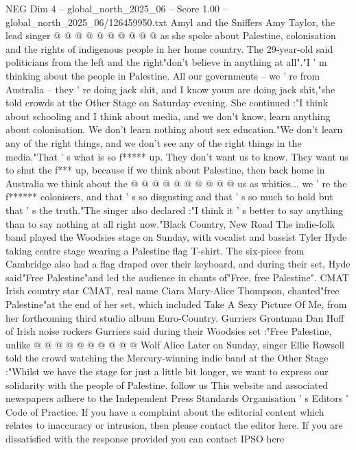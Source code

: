 \begin{textsample}{NEG Dim 4 – global\_north\_2025\_06 – Score 1.00 – global\_north\_2025\_06/126459950.txt}
Amyl and the Sniffers Amy Taylor, the lead singer @ @ @ @ @ @ @ @ @ @ as she spoke about Palestine, colonisation and the rights of indigenous people in her home country.
The 29-year-old said politicians from the left and the right"don't believe in anything at all"."I ' m thinking about the people in Palestine.
All our governments -- we ' re from Australia -- they ' re doing jack shit, and I know yours are doing jack shit,"she told crowds at the Other Stage on Saturday evening.
She continued :"I think about schooling and I think about media, and we don't know, learn anything about colonisation.
We don't learn nothing about sex education."We don't learn any of the right things, and we don't see any of the right things in the media."That ' s what is so f***** up.
They don't want us to know.
They want us to shut the f*** up, because if we think about Palestine, then back home in Australia we think about the @ @ @ @ @ @ @ @ @ @ us as whities... we ' re the f****** colonisers, and that ' s so disgusting and that ' s so much to hold but that ' s the truth."The singer also declared :"I think it ' s better to say anything than to say nothing at all right now."Black Country, New Road The indie-folk band played the Woodsies stage on Sunday, with vocalist and bassist Tyler Hyde taking centre stage wearing a Palestine flag T-shirt.
The six-piece from Cambridge also had a flag draped over their keyboard, and during their set, Hyde said"Free Palestine"and led the audience in chants of"Free, free Palestine".
CMAT Irish country star CMAT, real name Ciara Mary-Alice Thompson, chanted"free Palestine"at the end of her set, which included Take A Sexy Picture Of Me, from her forthcoming third studio album Euro-Country.
Gurriers Grontman Dan Hoff of Irish noise rockers Gurriers said during their Woodsies set :"Free Palestine, unlike @ @ @ @ @ @ @ @ @ @ Wolf Alice Later on Sunday, singer Ellie Rowsell told the crowd watching the Mercury-winning indie band at the Other Stage :"Whilst we have the stage for just a little bit longer, we want to express our solidarity with the people of Palestine. follow us This website and associated newspapers adhere to the Independent Press Standards Organisation ' s Editors ' Code of Practice.
If you have a complaint about the editorial content which relates to inaccuracy or intrusion, then please contact the editor here.
If you are dissatisfied with the response provided you can contact IPSO here

\end{textsample}
